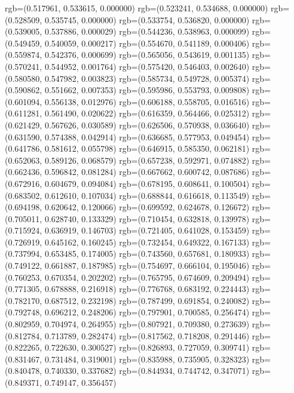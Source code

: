 {{{					rgb=(0.517961, 0.533615, 0.000000)
					rgb=(0.523241, 0.534688, 0.000000)
					rgb=(0.528509, 0.535745, 0.000000)
					rgb=(0.533754, 0.536820, 0.000000)
					rgb=(0.539005, 0.537886, 0.000029)
					rgb=(0.544236, 0.538963, 0.000099)
					rgb=(0.549459, 0.540059, 0.000217)
					rgb=(0.554670, 0.541189, 0.000406)
					rgb=(0.559874, 0.542376, 0.000699)
					rgb=(0.565056, 0.543619, 0.001135)
					rgb=(0.570241, 0.544952, 0.001764)
					rgb=(0.575420, 0.546403, 0.002640)
					rgb=(0.580580, 0.547982, 0.003823)
					rgb=(0.585734, 0.549728, 0.005374)
					rgb=(0.590862, 0.551662, 0.007353)
					rgb=(0.595986, 0.553793, 0.009808)
					rgb=(0.601094, 0.556138, 0.012976)
					rgb=(0.606188, 0.558705, 0.016516)
					rgb=(0.611281, 0.561490, 0.020622)
					rgb=(0.616359, 0.564466, 0.025312)
					rgb=(0.621429, 0.567626, 0.030589)
					rgb=(0.626506, 0.570938, 0.036640)
					rgb=(0.631590, 0.574388, 0.042914)
					rgb=(0.636685, 0.577953, 0.049454)
					rgb=(0.641786, 0.581612, 0.055798)
					rgb=(0.646915, 0.585350, 0.062181)
					rgb=(0.652063, 0.589126, 0.068579)
					rgb=(0.657238, 0.592971, 0.074882)
					rgb=(0.662436, 0.596842, 0.081284)
					rgb=(0.667662, 0.600742, 0.087686)
					rgb=(0.672916, 0.604679, 0.094084)
					rgb=(0.678195, 0.608641, 0.100504)
					rgb=(0.683502, 0.612610, 0.107034)
					rgb=(0.688844, 0.616618, 0.113549)
					rgb=(0.694198, 0.620642, 0.120066)
					rgb=(0.699592, 0.624678, 0.126672)
					rgb=(0.705011, 0.628740, 0.133329)
					rgb=(0.710454, 0.632818, 0.139978)
					rgb=(0.715924, 0.636919, 0.146703)
					rgb=(0.721405, 0.641028, 0.153459)
					rgb=(0.726919, 0.645162, 0.160245)
					rgb=(0.732454, 0.649322, 0.167133)
					rgb=(0.737994, 0.653485, 0.174005)
					rgb=(0.743560, 0.657681, 0.180933)
					rgb=(0.749122, 0.661887, 0.187985)
					rgb=(0.754697, 0.666104, 0.195046)
					rgb=(0.760253, 0.670354, 0.202202)
					rgb=(0.765795, 0.674609, 0.209494)
					rgb=(0.771305, 0.678888, 0.216918)
					rgb=(0.776768, 0.683192, 0.224443)
					rgb=(0.782170, 0.687512, 0.232198)
					rgb=(0.787499, 0.691854, 0.240082)
					rgb=(0.792748, 0.696212, 0.248206)
					rgb=(0.797901, 0.700585, 0.256474)
					rgb=(0.802959, 0.704974, 0.264955)
					rgb=(0.807921, 0.709380, 0.273639)
					rgb=(0.812784, 0.713789, 0.282474)
					rgb=(0.817562, 0.718208, 0.291446)
					rgb=(0.822265, 0.722630, 0.300527)
					rgb=(0.826893, 0.727059, 0.309741)
					rgb=(0.831467, 0.731484, 0.319001)
					rgb=(0.835988, 0.735905, 0.328323)
					rgb=(0.840478, 0.740330, 0.337682)
					rgb=(0.844934, 0.744742, 0.347071)
					rgb=(0.849371, 0.749147, 0.356457)
}}}
